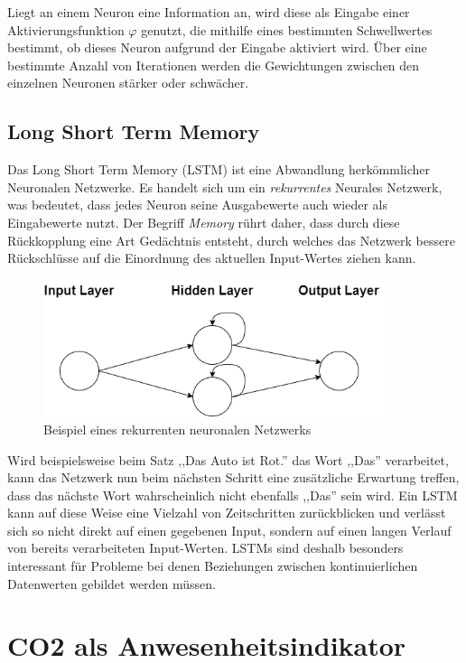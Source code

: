 Liegt an einem Neuron eine Information an, wird diese als Eingabe einer Aktivierungsfunktion $\varphi$ genutzt, 
die mithilfe eines bestimmten Schwellwertes bestimmt, ob dieses Neuron aufgrund der Eingabe aktiviert wird. Über eine 
bestimmte Anzahl von Iterationen werden die Gewichtungen zwischen den einzelnen Neuronen stärker oder schwächer.


\subsection{Long Short Term Memory}
Das Long Short Term Memory (LSTM) ist eine Abwandlung herkömmlicher Neuronalen Netzwerke. Es handelt sich um ein
\textit{rekurrentes} Neurales Netzwerk, was bedeutet, dass jedes Neuron seine Ausgabewerte auch wieder als Eingabewerte
nutzt. Der Begriff \textit{Memory} rührt daher, dass durch diese Rückkopplung eine Art Gedächtnis entsteht, durch 
welches das Netzwerk bessere Rückschlüsse auf die Einordnung des aktuellen Input-Wertes ziehen kann.\\

\begin{figure}[h]
    \centering
    \includegraphics[width=10.0cm]{pic/RecurrentNN.png}
    \caption{Beispiel eines rekurrenten neuronalen Netzwerks}
    \label{fig:RecNN}
\end{figure}

Wird beispielsweise beim Satz ,,Das Auto ist Rot.'' das Wort ,,Das'' verarbeitet, kann das Netzwerk nun beim nächsten
Schritt eine zusätzliche Erwartung treffen, dass das nächste Wort wahrscheinlich nicht ebenfalls ,,Das'' sein wird.
Ein LSTM kann auf diese Weise eine Vielzahl von Zeitschritten zurückblicken und verlässt sich so nicht direkt auf 
einen gegebenen Input, sondern auf einen langen Verlauf von bereits verarbeiteten Input-Werten. 
LSTMs sind deshalb besonders interessant für Probleme bei denen Beziehungen zwischen kontinuierlichen 
Datenwerten gebildet werden müssen.\newpage

\section{CO2 als Anwesenheitsindikator}\label{CO2}

